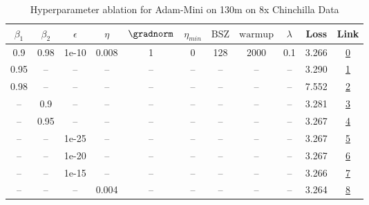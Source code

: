 \begin{table}[H]
\centering
\caption{Hyperparameter ablation for Adam-Mini on 130m on 8x Chinchilla Data}
\label{tab:ablation_adam-mini_130m_on_8x_chinchilla_data}
\begin{tabular}{ccccccccccc}
\toprule
$\beta_1$ & $\beta_2$ & $\epsilon$ & $\eta$ & $\gradnorm$ & $\eta_{min}$ & $\mathrm{BSZ}$ & $\mathrm{warmup}$ & $\lambda$ & Loss & Link \\
\midrule
0.9 & 0.98 & 1e-10 & 0.008 & 1 & 0 & 128 & 2000 & 0.1 & 3.266 & \href{https://wandb.ai/stanford-mercury/optimizer-scaling/runs/sweep-130m-21B-miniac2e1elr0.008-wd0.1-minlr0-warmup2000-b10.9-b-d489dc}{0} \\
\midrule
0.95 & -- & -- & -- & -- & -- & -- & -- & -- & 3.290 & \href{https://wandb.ai/stanford-mercury/optimizer-scaling/runs/sweep-130m-21B-mini117b84lr0.008-wd0.1-minlr0-warmup2000-b10.95--817e0e}{1} \\
0.98 & -- & -- & -- & -- & -- & -- & -- & -- & 7.552 & \href{https://wandb.ai/stanford-mercury/optimizer-scaling/runs/sweep-130m-21B-mini9179b1lr0.008-wd0.1-minlr0-warmup2000-b10.98--93bc9f}{2} \\
-- & 0.9 & -- & -- & -- & -- & -- & -- & -- & 3.281 & \href{https://wandb.ai/stanford-mercury/optimizer-scaling/runs/sweep-130m-21B-minic5318dlr0.008-wd0.1-minlr0-warmup2000-b10.9-b-6f8a67}{3} \\
-- & 0.95 & -- & -- & -- & -- & -- & -- & -- & 3.267 & \href{https://wandb.ai/stanford-mercury/optimizer-scaling/runs/sweep-130m-21B-minic96875lr0.008-wd0.1-minlr0-warmup2000-b10.9-b-fa1dd8}{4} \\
-- & -- & 1e-25 & -- & -- & -- & -- & -- & -- & 3.267 & \href{https://wandb.ai/stanford-mercury/optimizer-scaling/runs/sweep-130m-21B-minidd3b3clr0.008-wd0.1-minlr0-warmup2000-b10.9-b-1d94ce}{5} \\
-- & -- & 1e-20 & -- & -- & -- & -- & -- & -- & 3.267 & \href{https://wandb.ai/stanford-mercury/optimizer-scaling/runs/sweep-130m-21B-mini88561dlr0.008-wd0.1-minlr0-warmup2000-b10.9-b-f66e88}{6} \\
-- & -- & 1e-15 & -- & -- & -- & -- & -- & -- & 3.266 & \href{https://wandb.ai/stanford-mercury/optimizer-scaling/runs/sweep-130m-21B-mini3c1780lr0.008-wd0.1-minlr0-warmup2000-b10.9-b-9a05a7}{7} \\
-- & -- & -- & 0.004 & -- & -- & -- & -- & -- & 3.264 & \href{https://wandb.ai/stanford-mercury/optimizer-scaling/runs/sweep-130m-21B-mini5c5f85lr0.004-wd0.1-minlr0-warmup2000-b10.9-b-eaf3db}{8} \\

\end{tabular}
\end{table}
